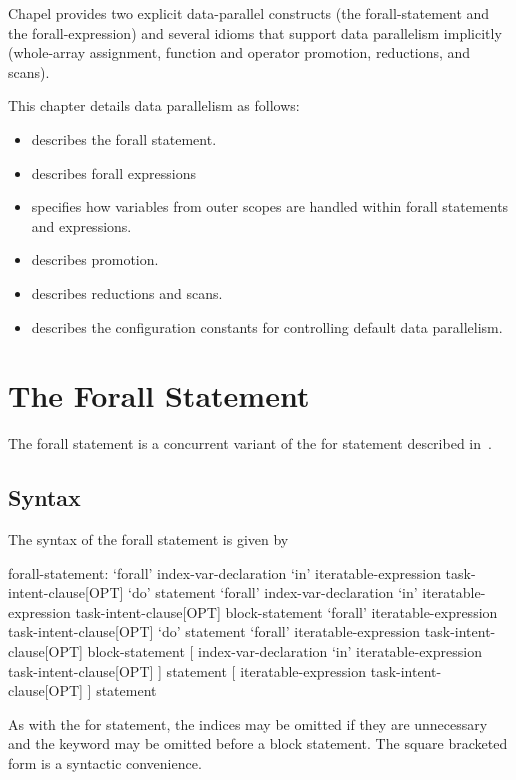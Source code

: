 \label{Data_Parallelism}

Chapel provides two explicit data-parallel constructs (the
forall-statement and the forall-expression) and several idioms that
support data parallelism implicitly (whole-array assignment, function
and operator promotion, reductions, and scans).

This chapter details data parallelism as follows:
\begin{itemize}
\item {} describes the forall statement.
\item {} describes forall expressions
\item {} specifies how variables from outer scopes
are handled within forall statements and expressions.
\item {} describes promotion.
\item {} describes reductions and scans.
\item {} describes the configuration constants for
controlling default data parallelism.
\end{itemize}       

\section{The Forall Statement}
\label{Forall}

The forall statement is a concurrent variant of the for statement
described in~.

\subsection{Syntax}
\label{forall_syntax}

The syntax of the forall statement is given by
\begin{syntax}
forall-statement:
  `forall' index-var-declaration `in' iteratable-expression task-intent-clause[OPT] `do' statement
  `forall' index-var-declaration `in' iteratable-expression task-intent-clause[OPT] block-statement
  `forall' iteratable-expression task-intent-clause[OPT] `do' statement
  `forall' iteratable-expression task-intent-clause[OPT] block-statement
  [ index-var-declaration `in' iteratable-expression task-intent-clause[OPT] ] statement
  [ iteratable-expression task-intent-clause[OPT] ] statement
\end{syntax}
As with the for statement, the indices may be omitted if they are
unnecessary and the  keyword may be omitted before a block
statement.  The square bracketed form is a syntactic convenience.


